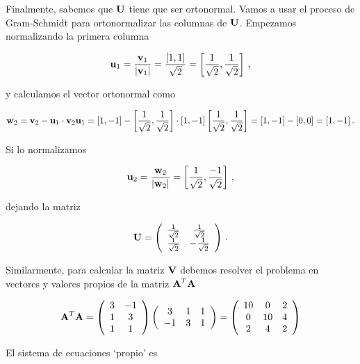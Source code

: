 \documentclass[
]{agujournal2019}
\begin{document}
Finalmente, sabemos que \({\textbf U}\) tiene que ser ortonormal. Vamos
a usar el proceso de Gram-Schmidt para ortonormalizar las columnas de
\({\textbf U}\). Empezamos normalizando la primera columna

\[{\textbf u}_1=\frac{{\textbf v}_1}{|{\textbf v}_1|}=\frac{[1,1]}{\sqrt{2}}=\left[ \frac{1}{\sqrt{2}}, \frac{1}{\sqrt{2}} \right]\,,\]

y calculamos el vector ortonormal como

\[{\textbf w}_2={\textbf v}_2-{\textbf u}_1\cdot{\textbf v}_2{\textbf u}_1=[1,-1]-\left[ \frac{1}{\sqrt{2}}, \frac{1}{\sqrt{2}} \right]
\cdot[1,-1]\left[ \frac{1}{\sqrt{2}}, \frac{1}{\sqrt{2}} \right]=[1,-1]-[0,0]=[1,-1]\,.\]

Si lo normalizamos

\[{\textbf u}_2=\frac{{\textbf w}_2}{|{\textbf w}_2|}=\left[ \frac{1}{\sqrt{2}}, \frac{-1}{\sqrt{2}} \right]\,,\]

dejando la matriz

\[{\textbf U}=\left(\begin{array}{cc}
  \frac{1}{\sqrt{2}} & \frac{1}{\sqrt{2}} \\
  \frac{1}{\sqrt{2}} & -\frac{1}{\sqrt{2}} \\
\end{array}\right)\,.\]

Similarmente, para calcular la matriz \({\textbf V}\) debemos resolver
el problema en vectores y valores propios de la matriz
\({\textbf A}^T{\textbf A}\)

\[{\textbf A}^T{\textbf A}=\left(\begin{array}{ccc}
  3 & -1 \\
  1 & 3 \\
  1 & 1 \\
      \end{array}\right)\left(\begin{array}{ccc}
  3 & 1 & 1\\
  -1 & 3 & 1\\
      \end{array}\right)=
      \left(\begin{array}{ccc}
  10 & 0 & 2 \\
  0 & 10 & 4\\
  2 & 4 & 2\\
      \end{array}\right)
      \]

El sistema de ecuaciones `propio' es
\end{document}
